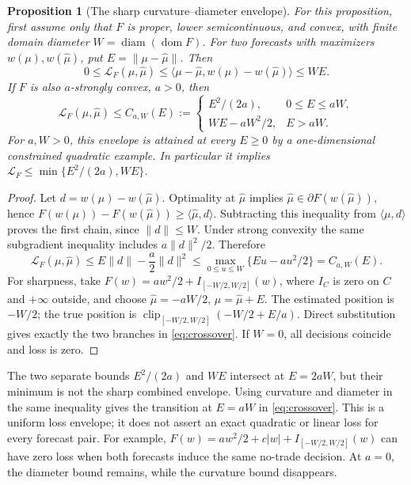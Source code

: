 \documentclass[11pt]{article}
\theoremstyle{plain}
\newtheorem{proposition}[theorem]{Proposition}
\theoremstyle{definition}
\theoremstyle{remark}
\newcommand{\norm}[1]{\lVert#1\rVert}
\newcommand{\ip}[2]{\langle#1,#2\rangle}
\begin{document}
\begin{proposition}[The sharp curvature--diameter envelope]
\label{prop:crossover}
For this proposition, first assume only that \(F\) is proper, lower
semicontinuous, and convex, with finite domain diameter
\(W=\operatorname{diam}(\operatorname{dom}F)\).
For two forecasts with maximizers \(w(\mu),w(\widehat\mu)\), put
\(E=\norm{\mu-\widehat\mu}\). Then
\[
0\le\mathcal L_F(\mu,\widehat\mu)
\le\ip{\mu-\widehat\mu}{w(\mu)-w(\widehat\mu)}\le WE.
\]
If \(F\) is also \(a\)-strongly convex, \(a>0\), then
\begin{equation}\label{eq:crossover}
\mathcal L_F(\mu,\widehat\mu)\le C_{a,W}(E):=
\begin{cases}
E^2/(2a),&0\le E\le aW,\\
WE-aW^2/2,&E>aW.
\end{cases}
\end{equation}
For \(a,W>0\), this envelope is attained at every \(E\ge0\) by a
one-dimensional constrained quadratic example. In particular it implies
\(\mathcal L_F\le\min\{E^2/(2a),WE\}\).
\end{proposition}
\begin{proof}
Let \(d=w(\mu)-w(\widehat\mu)\).
Optimality at \(\widehat\mu\) implies
\(\widehat\mu\in\partial F(w(\widehat\mu))\), hence
\(F(w(\mu))-F(w(\widehat\mu))\ge\ip{\widehat\mu}{d}\).
Subtracting this inequality from \(\ip\mu d\) proves the first
chain, since \(\norm d\le W\).
Under strong convexity the same subgradient inequality includes
\(a\norm d^2/2\). Therefore
\[
\mathcal L_F(\mu,\widehat\mu)
\le E\norm d-\frac a2\norm d^2
\le\max_{0\le u\le W}\{Eu-au^2/2\}=C_{a,W}(E).
\]
For sharpness, take
\(F(w)=aw^2/2+I_{[-W/2,W/2]}(w)\), where \(I_C\) is zero on
\(C\) and \(+\infty\) outside, and choose
\(\widehat\mu=-aW/2\), \(\mu=\widehat\mu+E\).
The estimated position is \(-W/2\); the true position is
\(\operatorname{clip}_{[-W/2,W/2]}(-W/2+E/a)\).
Direct substitution gives exactly the two branches in
\eqref{eq:crossover}. If \(W=0\), all decisions coincide and loss
is zero.
\end{proof}

The two separate bounds \(E^2/(2a)\) and \(WE\) intersect at
\(E=2aW\), but their minimum is not the sharp combined envelope.
Using curvature and diameter in the same inequality gives the
transition at \(E=aW\) in \eqref{eq:crossover}. This is a uniform
loss envelope; it does not assert an exact quadratic or linear
loss for every forecast pair. For example,
\(F(w)=aw^2/2+c|w|+I_{[-W/2,W/2]}(w)\) can have zero loss when
both forecasts induce the same no-trade decision. At \(a=0\), the
diameter bound remains, while the curvature bound disappears.
\end{document}
